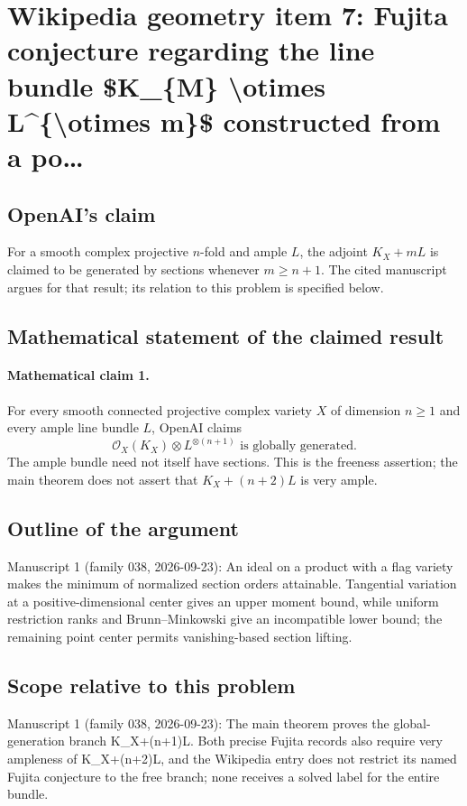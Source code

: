 \documentclass[11pt]{article}
\begin{document}
\section*{Wikipedia geometry item 7: Fujita conjecture regarding the line bundle \$K\_\{M\} \textbackslash{}otimes L\textasciicircum{}\{\textbackslash{}otimes m\}\$ constructed from a po…}

\subsection{OpenAI's claim}
For a smooth complex projective $n$-fold and ample $L$, the adjoint $K_X+mL$ is claimed to be generated by sections whenever $m\ge n+1$. The cited manuscript argues for that result; its relation to this problem is specified below.

\subsection{Mathematical statement of the claimed result}
\paragraph{Mathematical claim 1.} For every smooth connected projective complex variety $X$ of dimension $n\ge1$ and every ample line bundle $L$, OpenAI claims
\[
\mathcal O_X(K_X)\otimes L^{\otimes(n+1)}\text{ is globally generated}.
\]
The ample bundle need not itself have sections. This is the freeness assertion; the main theorem does not assert that $K_X+(n+2)L$ is very ample.

\subsection{Outline of the argument}
Manuscript 1 (family 038, 2026-09-23): An ideal on a product with a flag variety makes the minimum of normalized section orders attainable. Tangential variation at a positive-dimensional center gives an upper moment bound, while uniform restriction ranks and Brunn--Minkowski give an incompatible lower bound; the remaining point center permits vanishing-based section lifting.

\subsection{Scope relative to this problem}
Manuscript 1 (family 038, 2026-09-23): The main theorem proves the global-generation branch K\_X+(n+1)L. Both precise Fujita records also require very ampleness of K\_X+(n+2)L, and the Wikipedia entry does not restrict its named Fujita conjecture to the free branch; none receives a solved label for the entire bundle.
\end{document}
